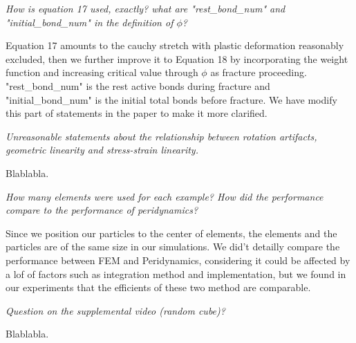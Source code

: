 \emph{How is equation 17 used, exactly? what are "rest\_bond\_num" and "initial\_bond\_num" in the definition of $\phi$?}

Equation 17 amounts to the cauchy stretch with plastic deformation reasonably excluded, then we further improve it to Equation 18 by incorporating the weight function and increasing critical value through $\phi$ as fracture proceeding. "rest\_bond\_num" is the rest active bonds during fracture and "initial\_bond\_num" is the initial total bonds before fracture. We have modify this part of statements in the paper to make it more clarified.

\emph{Unreasonable statements about the relationship between rotation artifacts, geometric linearity and stress-strain linearity.}

Blablabla.

\emph{How many elements were used for each example? How did the performance compare to the performance of peridynamics?}

Since we position our particles to the center of elements, the elements and the particles are of the same size in our simulations.
We did't detailly compare the performance between FEM and Peridynamics, considering it could be affected by a lof of factors such as integration method and implementation, but we found in our experiments that the efficients of these two method are comparable.

\emph{Question on the supplemental video (random cube)?}

Blablabla.


%





